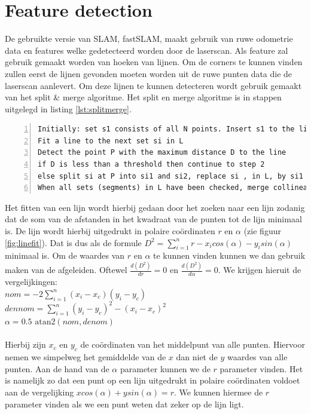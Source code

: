 \documentclass[a4paper]{article}
\begin{document}
\section{Feature detection}
De gebruikte versie van SLAM, fastSLAM, maakt gebruik van ruwe odometrie data en features welke gedetecteerd worden door de laserscan.
Als feature zal gebruik gemaakt worden van hoeken van lijnen. Om de corners te kunnen vinden zullen eerst de lijnen gevonden moeten worden uit de ruwe punten data die de laserscan aanlevert. Om deze lijnen te kunnen detecteren wordt gebruik gemaakt van het split \& merge algoritme. Het split en merge algoritme is in stappen uitgelegd in listing \ref{lst:splitmerge}.

\begin{lstlisting}[caption= Split \& merge algorithm, label=lst:splitmerge, numbers=left]
Initially: set s1 consists of all N points. Insert s1 to the list L. Set index i=1
Fit a line to the next set si in L
Detect the point P with the maximum distance D to the line
if D is less than a threshold then continue to step 2
else split si at P into si1 and si2, replace si , in L, by si1 and si2. Continue to step 2
When all sets (segments) in L have been checked, merge collinear segments.
\end{lstlisting}

\noindent Het fitten van een lijn wordt hierbij gedaan door het zoeken naar een lijn zodanig dat de som van de afstanden in het kwadraat van de punten tot de lijn minimaal is. De lijn wordt hierbij uitgedrukt in polaire co\"ordinaten $r$ en $\alpha$ (zie figuur \ref{fig:linefit}). 
Dat is dus als de formule $D^2 = \sum\limits_{i=1}^n r-x_i cos(\alpha) - y_i sin(\alpha)$ minimaal is. Om de waardes van $r$ en $\alpha$ te kunnen vinden kunnen we dan gebruik maken van de afgeleiden. Oftewel $\frac{d(D^2)}{dr} = 0$ en $\frac{d(D^2)}{d\alpha} = 0$.
We krijgen hieruit de vergelijkingen:\\
$nom =  -2\sum\limits_{i=1}^n (x_i - x_c)(y_i - y_c)$\\
$dennom =  \sum\limits_{i=1}^n (y_i - y_c)^2 - (x_i - x_c)^2$\\
$\alpha = 0.5\mbox{ atan2}(nom, denom)$\\\\
Hierbij zijn $x_c$ en $y_c$ de co\"ordinaten van het middelpunt van alle punten. Hiervoor nemen we simpelweg het gemiddelde van de $x$ dan niet de $y$ waardes van alle punten. Aan de hand van de $\alpha$ parameter kunnen we de $r$ parameter vinden.
Het is namelijk zo dat een punt op een lijn uitgedrukt in polaire co\"ordinaten voldoet aan de vergelijking $x cos(\alpha) + y sin(\alpha) = r$. We kunnen hiermee de $r$ parameter vinden als we een punt weten dat zeker op de lijn ligt. 
\end{document}
